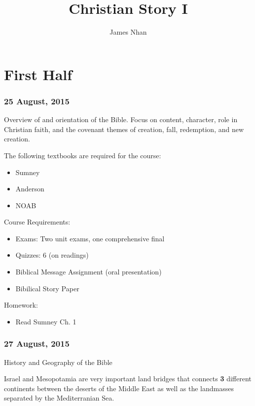 \documentclass{article}
\title{Christian Story I}
\author{James Nhan}
\date{\longdate{\today}}
\begin{document}
\maketitle

\clearpage
\tableofcontents
\clearpage

\part{First Half}
\section{25 August, 2015}
    Overview of and orientation of the Bible. Focus on content, character, role in Christian faith, and the covenant themes of creation, fall, redemption, and new creation.
    \vspace{10pt}

    \noindent The following textbooks are required for the course:

    \begin{itemize}
        \item Sumney
        \item Anderson
        \item NOAB
    \end{itemize}

    \noindent Course Requirements:

    \begin{itemize}
        \item Exams: Two unit exams, one comprehensive final
        \item Quizzes: 6 (on readings)
        \item Biblical Message Assignment (oral presentation)
        \item Bibilical Story Paper
    \end{itemize}

    \noindent Homework:

    \begin{itemize}
        \item Read Sumney Ch. 1
    \end{itemize}

\section{27 August, 2015}
\centerline{History and Geography of the Bible}

    Israel and Mesopotamia are very important land bridges that connects \textbf{3} different continents between the deserts of the Middle East as well as the landmasses separated by the Mediterranian Sea.
\end{document}
